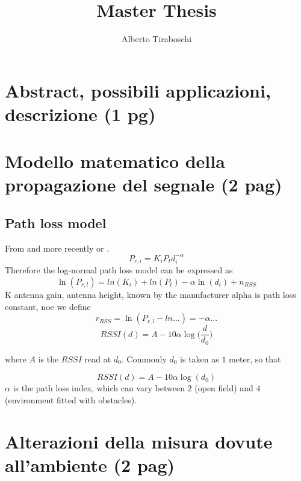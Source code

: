 \documentclass[12pt]{report}
\title{Master Thesis}
\author{Alberto Tiraboschi}
\begin{document}

\maketitle
\cleardoublepage

\tableofcontents
\cleardoublepage

\chapter{Abstract, possibili applicazioni, descrizione (1 pg)}
\clearpage

\chapter{Modello matematico della propagazione del segnale (2 pag)}
\section{Path loss model}
From \cite{330153} and more recently \cite{10.5555/2161958} or \cite{330153,10.5555/2161958}.
\begin{equation}
    P_{r,i}=K_iP_td_i^{-\alpha}
\end{equation}
Therefore the log-normal path loss model can be expressed as 
\begin{equation}
    \ln(P_{r,l})=ln(K_i)+ln(P_t)-\alpha\ln(d_i)+n_{RSS}
\end{equation}
K antenna gain, antenna height, known by the manufacturer alpha is path loss constant, noe we define
\begin{equation}
    r_{RSS}=\ln(P_{r,l}-ln...)=-\alpha...
\end{equation}
\begin{equation}
RSSI(d) = A-10\alpha\log\bigg(\frac{d}{d_0}\bigg)    
\end{equation}

where $A$ is the $RSSI$ read at $d_0$. Commonly $d_0$ is taken as $1$ meter, so that 

\begin{equation}
RSSI(d) = A-10\alpha\log(d_0)    
\end{equation}
$\alpha$ is the path loss index, which can vary between $2$ (open field) and $4$ (environment fitted with obstacles).
\clearpage


\chapter{Alterazioni della misura dovute all'ambiente (2 pag)}
\end{document}
